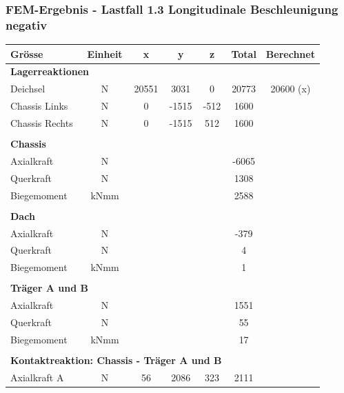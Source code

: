 
  \subsubsection{FEM-Ergebnis - Lastfall 1.3 Longitudinale Beschleunigung negativ}
  \begin{table}[H]
  \centering
  \begin{tabular}{lcccccc}
  Grösse	&	Einheit	&	x	&	y	&	z	&	Total	&	Berechnet	\\	\hline
  \multicolumn{5}{l}{\textbf{Lagerreaktionen}}									&		&		\\	\thickhline
  Deichsel	&	N	&	20551	&	3031	&	0	&	20773	&	20600 (x)	\\
  Chassis Links	&	N	&	0	&	-1515	&	-512	&	1600	&		\\
  Chassis Rechts	&	N	&	0	&	-1515	&	512	&	1600	&		\\	\hline	\\
  \multicolumn{5}{l}{\textbf{Chassis}}									&		&		\\	\thickhline
  Axialkraft	&	N	&		&		&		&	-6065	&		\\
  Querkraft	&	N	&		&		&		&	1308	&		\\
  Biegemoment	&	kNmm	&		&		&		&	2588	&		\\	\hline	\\
  \multicolumn{5}{l}{\textbf{Dach}}									&		&		\\	\thickhline
  Axialkraft	&	N	&		&		&		&	-379	&		\\
  Querkraft	&	N	&		&		&		&	4	&		\\
  Biegemoment	&	kNmm	&		&		&		&	1	&		\\	\hline	\\
  \multicolumn{5}{l}{\textbf{Träger A und B}}													\\	\thickhline
  Axialkraft	&	N	&		&		&		&	1551	&		\\
  Querkraft	&	N	&		&		&		&	55	&		\\
  Biegemoment	&	kNmm	&		&		&		&	17	&		\\	\hline	\\
  \multicolumn{5}{l}{\textbf{Kontaktreaktion: Chassis - Träger A und B}}									&		&		\\	\thickhline
  Axialkraft A	&	N	&	56	&	2086	&	323	&	2111	&		\\

\end{tabular}
\end{table}
